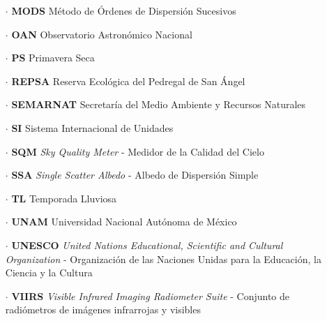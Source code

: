 \begin{itemize}
\item[$\cdot$] \textbf{MODS} Método de Órdenes de Dispersión Sucesivos

\item[$\cdot$] \textbf{OAN} Observatorio Astronómico Nacional

\item[$\cdot$] \textbf{PS} Primavera Seca

\item[$\cdot$] \textbf{REPSA} Reserva Ecológica del Pedregal de San Ángel

\item[$\cdot$] \textbf{SEMARNAT} Secretaría del Medio Ambiente y Recursos Naturales

\item[$\cdot$] \textbf{SI} Sistema Internacional de Unidades

\item[$\cdot$] \textbf{SQM} \textit{Sky Quality Meter} - Medidor de la Calidad del Cielo

\item[$\cdot$] \textbf{SSA} \textit{Single Scatter Albedo} - Albedo de Dispersión Simple

\item[$\cdot$] \textbf{TL} Temporada Lluviosa

\item[$\cdot$] \textbf{UNAM} Universidad Nacional Autónoma de México

\item[$\cdot$] \textbf{UNESCO} \textit{United Nations Educational, Scientific and Cultural Organization} - Organización de las Naciones Unidas para la Educación, la Ciencia y la Cultura

\item[$\cdot$] \textbf{VIIRS} \textit{Visible Infrared Imaging Radiometer Suite} - Conjunto de radiómetros de imágenes infrarrojas y visibles
			
\end{itemize}